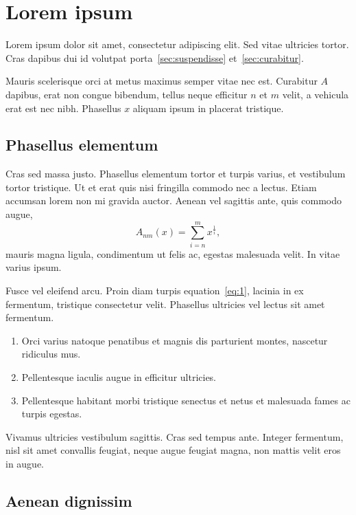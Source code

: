 \documentclass[a4paper,12pt]{article}
\begin{document}
\section{Lorem ipsum}
\label{sec:lorem}


Lorem ipsum dolor sit amet, consectetur adipiscing elit. Sed vitae
ultricies tortor. Cras dapibus dui id volutpat
porta~\ref{sec:suspendisse} et~\ref{sec:curabitur}. 


Mauris scelerisque orci at metus maximus semper vitae nec
est. Curabitur $A$ dapibus, erat non congue bibendum, tellus neque
efficitur $n$ et $m$ velit, a vehicula erat est nec nibh. Phasellus
$x$ aliquam ipsum in placerat tristique. 


\subsection{Phasellus elementum}
\label{subsec:phasellus}


Cras sed massa justo. Phasellus elementum tortor et turpis varius, et
vestibulum tortor tristique. Ut et erat quis nisi fringilla commodo
nec a lectus. Etiam accumsan lorem non mi gravida auctor. Aenean vel
sagittis ante, quis commodo augue, 
%
\begin{equation}
  \label{eq:1}
  A_{nm}(x) = \sum_{i = n}^m x^{\frac{1}{i}},
\end{equation}
%
mauris magna ligula, condimentum ut felis ac, egestas malesuada
velit. In vitae varius ipsum.


Fusce vel eleifend arcu. Proin diam turpis equation~\ref{eq:1},
lacinia in ex fermentum, tristique consectetur velit. Phasellus
ultricies vel lectus sit amet fermentum. 
%
\begin{enumerate}
%  
  \item Orci varius natoque penatibus et magnis dis parturient montes,
        nascetur ridiculus mus.
%
  \item Pellentesque iaculis augue in efficitur ultricies.
%
  \item Pellentesque habitant morbi tristique senectus et netus et
    malesuada fames ac turpis egestas.
%
\end{enumerate}
%
Vivamus ultricies vestibulum sagittis. Cras sed tempus ante. Integer
fermentum, nisl sit amet convallis feugiat, neque augue feugiat magna,
non mattis velit eros in augue.  


\subsection{Aenean dignissim}
\label{subsec:aenean}
\end{document}

